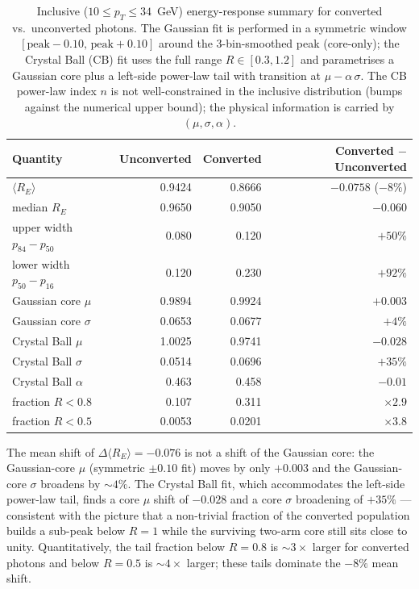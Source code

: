 \documentclass[11pt,a4paper]{article}
\begin{document}
\begin{table}[H]
\centering
\caption{Inclusive ($10 \le p_T \le 34$~GeV) energy-response summary for
converted vs.\ unconverted photons. The Gaussian fit is performed in a
symmetric window $[\mathrm{peak}-0.10,\,\mathrm{peak}+0.10]$ around the
3-bin-smoothed peak (core-only); the Crystal Ball (CB) fit uses the full
range $R\in[0.3,1.2]$ and parametrises a Gaussian core plus a left-side
power-law tail with transition at $\mu-\alpha\,\sigma$. The CB power-law
index $n$ is not well-constrained in the inclusive distribution (bumps
against the numerical upper bound); the physical information is carried by
$(\mu,\sigma,\alpha)$.
}
\label{tab:response_inclusive}
\begin{tabular}{lrrr}
\toprule
Quantity & Unconverted & Converted & Converted $-$ Unconverted \\
\midrule
$\langle R_E \rangle$               & 0.9424 & 0.8666 & $-0.0758$ ($-8\%$) \\
median $R_E$                         & 0.9650 & 0.9050 & $-0.060$ \\
upper width $p_{84}-p_{50}$         & 0.080  & 0.120  & $+50\%$ \\
lower width $p_{50}-p_{16}$         & 0.120  & 0.230  & $+92\%$ \\
Gaussian core $\mu$                  & 0.9894 & 0.9924 & $+0.003$ \\
Gaussian core $\sigma$               & 0.0653 & 0.0677 & $+4\%$ \\
Crystal Ball $\mu$                   & 1.0025 & 0.9741 & $-0.028$ \\
Crystal Ball $\sigma$                & 0.0514 & 0.0696 & $+35\%$ \\
Crystal Ball $\alpha$                & 0.463  & 0.458  & $-0.01$ \\
fraction $R<0.8$                    & 0.107  & 0.311  & $\times 2.9$ \\
fraction $R<0.5$                    & 0.0053 & 0.0201 & $\times 3.8$ \\
\bottomrule
\end{tabular}
\end{table}

The mean shift of $\Delta\langle R_E \rangle = -0.076$ is not a shift of the
Gaussian core: the Gaussian-core $\mu$ (symmetric $\pm0.10$ fit) moves by
only $+0.003$ and the Gaussian-core $\sigma$ broadens by $\sim 4\%$. The
Crystal Ball fit, which accommodates the left-side power-law tail, finds a
core $\mu$ shift of $-0.028$ and a core $\sigma$ broadening of $+35\%$ ---
consistent with the picture that a non-trivial fraction of the converted
population builds a sub-peak below $R=1$ while the surviving two-arm core
still sits close to unity. Quantitatively, the tail fraction below $R=0.8$
is $\sim 3\times$ larger for converted photons and below $R=0.5$ is
$\sim 4\times$ larger; these tails dominate the $-8\%$ mean shift.
\end{document}
